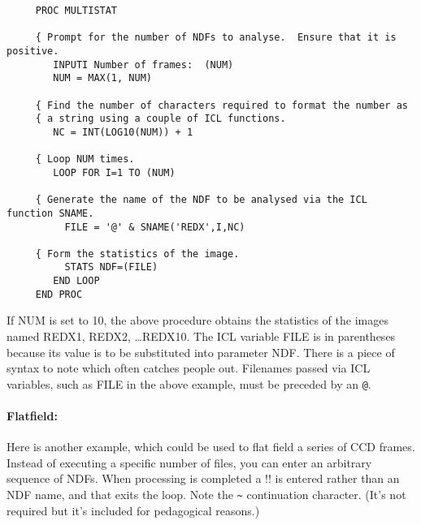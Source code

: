 \begin{small}
\begin{verbatim}
     PROC MULTISTAT

     { Prompt for the number of NDFs to analyse.  Ensure that it is positive.
        INPUTI Number of frames:  (NUM)
        NUM = MAX(1, NUM)

     { Find the number of characters required to format the number as
     { a string using a couple of ICL functions.
        NC = INT(LOG10(NUM)) + 1

     { Loop NUM times.
        LOOP FOR I=1 TO (NUM)

     { Generate the name of the NDF to be analysed via the ICL function SNAME.
          FILE = '@' & SNAME('REDX',I,NC)

     { Form the statistics of the image.
          STATS NDF=(FILE)
        END LOOP
     END PROC
\end{verbatim}
\end{small}

If NUM is set to 10, the above procedure obtains the statistics of the images
named REDX1, REDX2, \dots REDX10.
The {\small ICL} variable FILE is in parentheses because its value is to be
substituted into parameter NDF.
There is a piece of syntax to note which often catches people out.
Filenames passed via {\small ICL} variables, such as FILE in the above example,
must be preceded by an {\tt @}. 

\paragraph{Flatfield:}\hfill

Here is another example, which could be used to flat field a series of CCD
frames.
Instead of executing a specific number of files, you can enter an arbitrary
sequence of NDFs.
When processing is completed a !! is entered rather than an NDF name, and that
exits the loop.
Note the {\tt \~{}} continuation character.
(It's not required but it's included for pedagogical reasons.)
\pagebreak[3]

